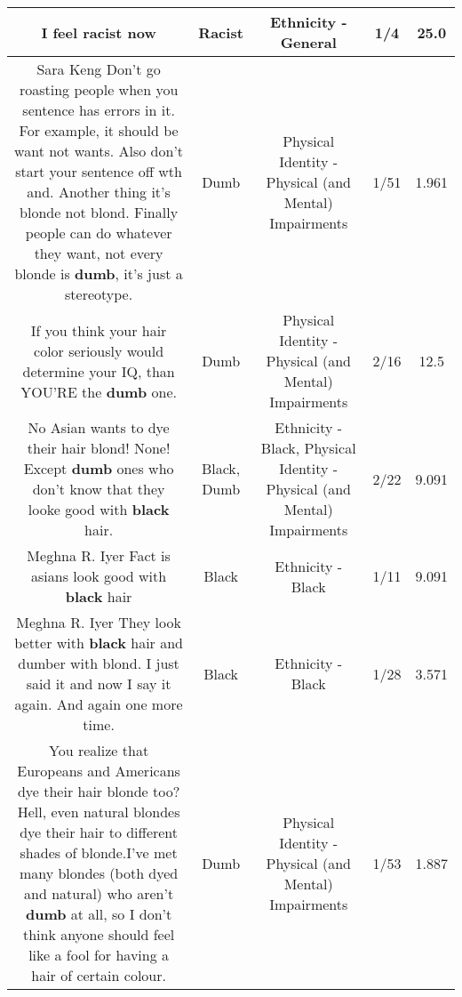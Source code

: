 \documentclass[11pt]{article}
\newlength\mylength
\begin{document}
\begin{center}
\begin{longtable}{|C{.65\mylength}|C{.30\mylength}|C{.12\mylength}|C{.12\mylength}|C{.12\mylength}|}
  \small I feel \textbf{racist} now\normalsize   & Racist & Ethnicity - General & 1/4 & 25.0 \\  \hline
  \small Sara Keng Don't go roasting people when you sentence has errors in it. For example, it should be want not wants. Also don't start your sentence off wth and. Another thing it's blonde not blond. Finally people can do whatever they want, not every blonde is \textbf{dumb}, it's just a stereotype.\normalsize   & Dumb & Physical Identity - Physical (and Mental) Impairments & 1/51 & 1.961 \\  \hline
  \small If you think your hair color seriously would determine your IQ, than YOU'RE the \textbf{dumb} one.\normalsize   & Dumb & Physical Identity - Physical (and Mental) Impairments & 2/16 & 12.5 \\  \hline
  \small No Asian wants to dye their hair blond! None! Except \textbf{dumb} ones who don't know that they looke good with \textbf{black} hair.\normalsize   & Black, Dumb & Ethnicity - Black, Physical Identity - Physical (and Mental) Impairments & 2/22 & 9.091 \\  \hline
  \small Meghna R. Iyer Fact is asians look good with \textbf{black} hair\normalsize   & Black & Ethnicity - Black & 1/11 & 9.091 \\  \hline
  \small Meghna R. Iyer They look better with \textbf{black} hair and dumber with blond. I just said it and now I say it again. And again one more time.\normalsize   & Black & Ethnicity - Black & 1/28 & 3.571 \\  \hline
  \small You realize that Europeans and Americans dye their hair blonde too? Hell, even natural blondes dye their hair to different shades of blonde.I've met many blondes (both dyed and natural) who aren't \textbf{dumb} at all, so I don't think anyone should feel like a fool for having a hair of certain colour.\normalsize   & Dumb & Physical Identity - Physical (and Mental) Impairments & 1/53 & 1.887 \\  \hline

\end{longtable}
\end{center}
\end{document}
